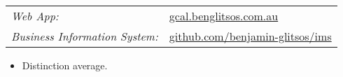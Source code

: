 \documentclass{main}
\begin{document}
\vspace{-0.5em}


\begin{flushleft}
    \begin{tabularx}{\textwidth}{X X}
        \hfill\textit{Web App:} & \href{https://gcal.benglitsos.com.au/}{gcal.benglitsos.com.au} \\
        \hfill\textit{Business Information System:} & \href{https://github.com/benjamin-glitsos/inventory-management-system}{github.com/benjamin-glitsos/ims} \\
    \end{tabularx}
\end{flushleft}

\vspace{-0.5em}


\begin{flushleft}


    \begin{itemize}
    \item Distinction average.
    \end{itemize}

\end{flushleft}
\end{document}
